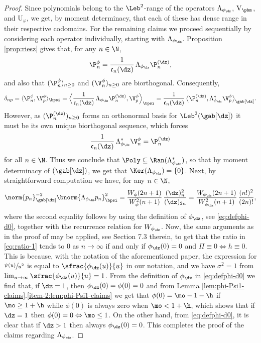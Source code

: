 \begin{proof}
Since polynomials belong to the $\Leb^2$-range of the operators $\Lambda_{\phi_{\dz}}$, $\mathrm{V}_{\phm}$, and $\mathrm{U}_\varphi$, we get, by moment determinacy, that each of these has dense range in their respective codomains. For the remaining claims we proceed sequentially by considering each operator individually, starting with $\Lambda_{\phi_{\dz}}$. Proposition \ref{prop:riesz} gives that, for any $n \in \N$,
\begin{equation*}
\P_n^\phi = \frac{1}{\mathfrak{c}_n(\dz)}\,\Lambda_{\phi_{\dz}} \P_n^{(\dz)},
\end{equation*}
and also that $(\P_n^\phi)_{n \geq 0}$ and $(\V_n^\phi)_{n \geq 0}$ are biorthogonal. Consequently,
\begin{equation*}
\delta_{np} = \langle \P_n^\phi, \V_p^\phi\rangle_\bpsi = \Bigl \langle \frac{1}{\mathfrak{c}_n(\dz)}\,\Lambda_{\phi_{\dz}} \P_n^{(\dz)}, \V_p^\phi \Bigr\rangle_\bpsi = \frac{1}{\mathfrak{c}_n(\dz)}\, \bigl\langle \P_n^{(\dz)}, \Lambda_{\phi_{\dz}}^* \V_p^\phi \bigr\rangle_{\gab[\dz]}.
\end{equation*}
However, as $(\P_n^{(\dz)})_{n \geq 0}$ forms an orthonormal basis for $\Leb^2(\gab[\dz])$ it must be its own unique biorthogonal sequence, which forces
\begin{equation*}
\frac{1}{\mathfrak{c}_n(\dz)}\,\Lambda_{\phi_{\dz}}^* \V_n^\phi = \P_n^{(\dz)}
\end{equation*}
for all $n \in \N$. Thus we conclude that $\Poly \subseteq \Ran(\Lambda_{\phi_{\dz}}^*)$, so that by moment determinacy of $(\gab[\dz])$, we get that $\Ker(\Lambda_{\phi_{\dz}}) = \{0\}$. Next, by straightforward computation we have, for any $n \in \N$,
\begin{equation}
\label{eq:ratio-1}
\norm{p_n}_{\gab[\dz]}^{-2}\bnorm{\Lambda_{\phi_{\dz}} p_n}_\bpsi^2 = \frac{W_\phi(2n+1)}{W_\phi^2(n+1)}\,\frac{(\dz)_n^2}{(\dz)_{2n}} = \frac{W_{\phi_{\dz}}(2n+1)}{W_{\phi_{\dz}}^2(n+1)}\,\frac{(n!)^2}{(2n)!},
\end{equation}
where the second equality follows by using the definition of $\phi_{\dz}$, see \eqref{eq:defphi-d0}, together with the recurrence relation for $W_{\phi_{\dz}}$. Now, the same arguments as in the proof of \cite[Th.\,7.1(2)]{Patie-Savov-GeL} may be applied, see \eg Section 7.3 therein, to get that the ratio in \eqref{eq:ratio-1} tends to 0 as $n \to \infty$ if and only if $\phi_{\dz}(0) = 0$ and $\Pi \equiv 0 \Leftrightarrow h \equiv 0$. This is because, with the notation of the aforementioned paper, the expression for $\sfrac{\psi(u)}{u^2}$ is equal to $\sfrac{\phi_{\dz}(u)}{u}$ in our notation, and we have $\sigma^2 = 1$ from $\lim_{u \to \infty} \sfrac{\phi_{\dz}(u)}{u} = 1$. From the definition of $\phi_{\dz}$ in \eqref{eq:defphi-d0} we find that, if $\dz = 1$, then $\phi_{\dz}(0) = \phi(0) = 0$ and from Lemma \ref{lem:phi-Psi1-claims}.\eqref{item-2:lem:phi-Psi1-claims} we get that $\phi(0) = \mo-1-\h$ if $\mo \geq 1+\h$ while $\phi(0)$ is always zero when $\mo < 1+\h$, which shows that if $\dz =1$ then $\phi(0)=0 \Leftrightarrow \mo \leq 1$. On the other hand, from \eqref{eq:defphi-d0}, it is clear that if $\dz > 1$ then always $\phi_{\dz}(0)=0$. This completes the proof of the claims regarding $\Lambda_{\phi_{\dz}}$.

\end{proof}
